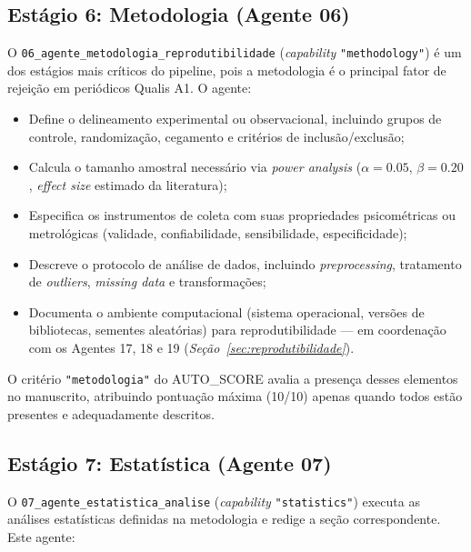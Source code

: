 \subsection{Estágio 6: Metodologia (Agente 06)}
\label{sec:estagio6}

O \texttt{06\_agente\_metodologia\_reprodutibilidade}
(\textit{capability} \texttt{"methodology"}) é um dos estágios mais
críticos do pipeline, pois a metodologia é o principal fator de
rejeição em periódicos Qualis A1. O agente:

\begin{itemize}
    \item Define o delineamento experimental ou observacional,
    incluindo grupos de controle, randomização, cegamento e
    critérios de inclusão/exclusão;

    \item Calcula o tamanho amostral necessário via \textit{power
    analysis} ($\alpha = 0.05$, $\beta = 0.20$, \textit{effect
    size} estimado da literatura);

    \item Especifica os instrumentos de coleta com suas
    propriedades psicométricas ou metrológicas (validade,
    confiabilidade, sensibilidade, especificidade);

    \item Descreve o protocolo de análise de dados, incluindo
    \textit{preprocessing}, tratamento de \textit{outliers},
    \textit{missing data} e transformações;

    \item Documenta o ambiente computacional (sistema operacional,
    versões de bibliotecas, sementes aleatórias) para
    reprodutibilidade — em coordenação com os Agentes 17, 18 e 19
    (\textit{Seção~\ref{sec:reprodutibilidade}}).
\end{itemize}

O critério \texttt{"metodologia"} do AUTO\_SCORE avalia a presença
desses elementos no manuscrito, atribuindo pontuação máxima (10/10)
apenas quando todos estão presentes e adequadamente descritos.

\subsection{Estágio 7: Estatística (Agente 07)}
\label{sec:estagio7}

O \texttt{07\_agente\_estatistica\_analise}
(\textit{capability} \texttt{"statistics"}) executa as análises
estatísticas definidas na metodologia e redige a seção
correspondente. Este agente:

